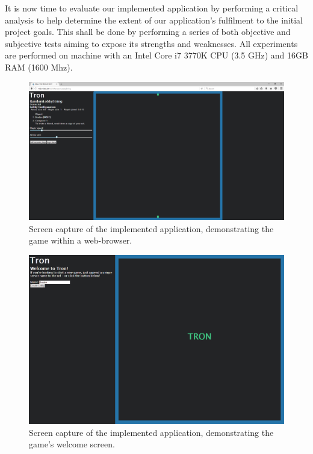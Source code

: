 \documentclass{standalone}
\begin{document}
	It is now time to evaluate our implemented application by performing a critical analysis to help determine the extent of our application's fulfilment to the initial project goals. This shall be done by performing a series of both objective and subjective tests aiming to expose its strengths and weaknesses. All experiments are performed on machine with an Intel Core i7 3770K CPU (3.5 GHz) and 16GB RAM (1600 Mhz).

	\begin{figure}[!htbp]
		\centering
		\includegraphics[width=\textwidth]{resources/images/inbrowser.png}
		\caption{Screen capture of the implemented application, demonstrating the game within a web-browser.}
	\end{figure}
	\FloatBarrier

	\begin{figure}[!htbp]
		\centering
		\includegraphics[width=\textwidth]{resources/images/welcome.png}
		\caption{Screen capture of the implemented application, demonstrating the game's welcome screen.}
	\end{figure}
	\FloatBarrier
\end{document}
